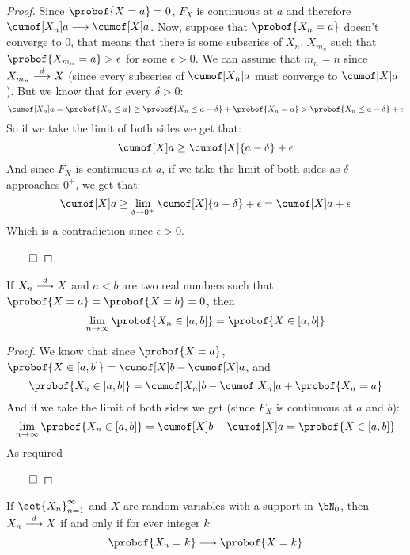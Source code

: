 \begin{proof}

	Since $\probof{X=a}=0$, $F_X$ is continuous at $a$ and therefore $\cumof[X_n]a\longrightarrow\cumof[X]a$.
	Now, suppose that $\probof{X_n=a}$ doesn't converge to $0$, that means that there is some subseries of $X_n$, $X_{m_n}$
	such that $\probof{X_{m_n}=a}>\epsilon$ for some $\epsilon>0$.
	We can assume that $m_n=n$ since $X_{m_n}\mathrel{\overset d\longrightarrow} X$ (since every subseries of $\cumof[X_n]a$ must converge to $\cumof[X]a$).
	But we know that for every $\delta>0$:
	\[ \cumof[X_n]a = \probof{X_n\leq a} \geq \probof{X_n\leq a-\delta} + \probof{X_n=a} > \probof{X_n\leq a-\delta} + \epsilon \]
	So if we take the limit of both sides we get that:
	\[ \cumof[X]a \geq \cumof[X]{a-\delta} + \epsilon \]
	And since $F_X$ is continuous at $a$, if we take the limit of both sides as $\delta$ approaches $0^+$, we get that:
	\[ \cumof[X]a \geq \lim_{\delta\to0^+}\cumof[X]{a-\delta} + \epsilon = \cumof[X]a + \epsilon \]
	Which is a contradiction since $\epsilon>0$.

	\hfill$\qed$

\end{proof}

\newpage
\begin{prop*}

	If $X_n\mathrel{\overset d\longrightarrow} X$ and $a<b$ are two real numbers such that $\probof{X=a}=\probof{X=b}=0$, then
	\[ \lim_{n\to\infty}\probof{X_n\in[a,b]} = \probof{X\in[a,b]} \]

\end{prop*}

\begin{proof}

	We know that since $\probof{X=a}$, $\probof{X\in[a,b]}=\cumof[X]b-\cumof[X]a$, and
	\[ \probof{X_n\in[a,b]} = \cumof[X_n]b - \cumof[X_n]a + \probof{X_n=a} \]
	And if we take the limit of both sides we get (since $F_X$ is continuous at $a$ and $b$):
	\[ \lim_{n\to\infty}\probof{X_n\in[a,b]} = \cumof[X]b - \cumof[X]a = \probof{X\in[a,b]} \]
	As required

	\hfill$\qed$

\end{proof}

\begin{prop*}

	If $\set{X_n}_{n=1}^\infty$ and $X$ are random variables with a support in $\bN_0$, then $X_n\mathrel{\overset d\longrightarrow} X$ if and only if for ever integer $k$:
	\[ \probof{X_n=k}\longrightarrow\probof{X=k} \]

\end{prop*}

